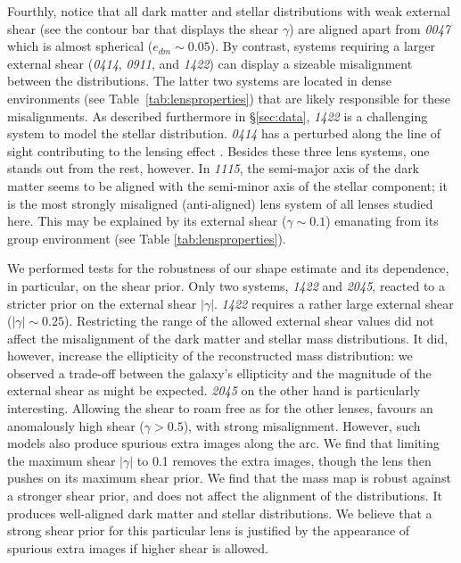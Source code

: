 \documentclass[useAMS,usenatbib]{mn2e}
\begin{document}
Fourthly, notice that all dark matter and stellar distributions with weak external shear (see the contour bar that displays the shear $\gamma$) are aligned apart from {\it0047} which is almost spherical ($e_{dm}\sim0.05$). By contrast, systems requiring a larger external shear ({\it0414}, {\it0911}, and {\it1422}) can display a sizeable misalignment between the distributions. The latter two systems are located in dense environments (see Table~\ref{tab:lensproperties}) that are likely responsible for these misalignments. As described furthermore in \S\ref{sec:data}, {\it1422} is a challenging system to model the stellar distribution. {\it0414} has a perturbed along the line of sight contributing to the lensing effect \citep{2011MNRAS.413L..86C}. Besides these three lens systems, one stands out from the rest, however. In {\it1115}, the semi-major axis of the dark matter seems to be aligned with the semi-minor axis of the stellar component; it is the most strongly misaligned (anti-aligned) lens system of all lenses studied here. This may be explained by its external shear ($\gamma \sim 0.1$) emanating from its group environment (see Table \ref{tab:lensproperties}).

We performed tests for the robustness of our shape estimate and its dependence, in particular, on the shear prior. Only two systems, {\it1422} and {\it2045}, reacted to a stricter prior on the external shear $|\gamma|$. {\it1422} requires a rather large external shear ($|\gamma|\sim0.25$). Restricting the range of the allowed external shear values did not affect the misalignment of the dark matter and stellar mass distributions. It did, however, increase the ellipticity of the reconstructed mass distribution: we observed a trade-off between the galaxy's ellipticity and the magnitude of the external shear as might be expected. {\it2045} on the other hand is particularly interesting. Allowing the shear to roam free as for the other lenses, favours an anomalously high shear ($\gamma > 0.5$), with strong misalignment. However, such models also produce spurious extra images along the arc. We find that limiting the maximum shear $|\gamma|$ to 0.1 removes the extra images, though the lens then pushes on its maximum shear prior. We find that the mass map is robust against a stronger shear prior, and does not affect the alignment of the distributions. It produces well-aligned dark matter and stellar distributions. We believe that a strong shear prior for this particular lens is justified by the appearance of spurious extra images if higher shear is allowed.
\end{document}
